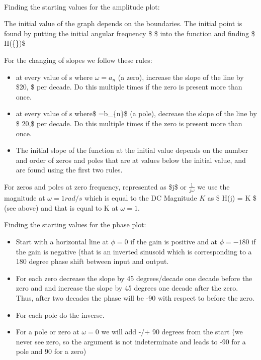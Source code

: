 \documentclass[11pt]{article}
\providecommand{\tightlist}{%
      \setlength{\itemsep}{0pt}\setlength{\parskip}{0pt}}
\begin{document}
    \begin{center}
    \end{center}
    { \hspace*{\fill} \\}
    
    Finding the starting values for the amplitude plot:

The initial value of the graph depends on the boundaries. The initial
point is found by putting the initial angular frequency \$ \omega\$ into
the function and finding \$
\textbar{}H(\{\}\omega )\textbar{}\$

For the changing of slopes we follow these rules:

\begin{itemize}
\tightlist
\item
  at every value of s where \(\omega =a_{n}\) (a zero), increase the
  slope of the line by \$20, \$ per decade. Do this multiple
  times if the zero is present more than once.
\item
  at every value of s where\$ \omega =b\_\{n\}\$ (a pole), decrease the
  slope of the line by \$ 20,\$ per decade. Do this multiple
  times if the zero is present more than once.
\item
  The initial slope of the function at the initial value depends on the
  number and order of zeros and poles that are at values below the
  initial value, and are found using the first two rules.
\end{itemize}

For zeros and poles at zero frequency, represented as \$j\omega \$ or
\(\frac{1}{j\omega}\) we use the magnitude at \(\omega = 1 rad/s\) which
is equal to the DC Magnitude \(K\) as \$\textbar{} H(j\omega)\textbar{}
= K  \$ (see above) and that is equal to K at
\(\omega = 1\).

Finding the starting values for the phase plot:

\begin{itemize}
\tightlist
\item
  Start with a horizontal line at \(\phi = 0\) if the gain is positive
  and at \(\phi = -180\) if the gain is negative (that is an inverted
  sinusoid which is corresponding to a 180 degree phase shift between
  input and output.
\item
  For each zero decrease the slope by 45 degrees/decade one decade
  before the zero and and increase the slope by 45 degrees one decade
  after the zero. Thus, after two decades the phase will be -90 with
  respect to before the zero.
\item
  For each pole do the inverse.
\item
  For a pole or zero at \(\omega = 0\) we will add -/+ 90 degrees from
  the start (we never see zero, so the argument is not indeterminate and
  leads to -90 for a pole and 90 for a zero)
\end{itemize}
\end{document}
